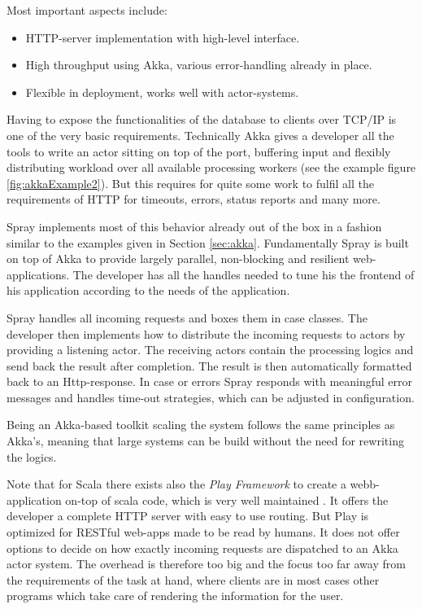 \documentclass[twoside, 11pt]{scrartcl}
\begin{document}
Most important aspects include:\\
\begin{itemize}
	\item HTTP-server implementation with high-level interface.
	\item High throughput using Akka, various error-handling already in place.
	\item Flexible in deployment, works well with actor-systems.
\end{itemize}

Having to expose the functionalities of the database to clients over TCP/IP is one of the very basic requirements.
Technically Akka gives a developer all the tools to write an actor sitting on top of the port, buffering input and flexibly distributing workload over all available processing workers (see the example figure \ref{fig:akkaExample2}). But this requires for quite some work to fulfil all the requirements of HTTP for timeouts, errors, status reports and many more.

Spray implements most of this behavior already out of the box in a fashion similar to the examples given in Section \ref{sec:akka}.
Fundamentally Spray is built on top of Akka to provide largely parallel, non-blocking and resilient web-applications. 
The developer has all the handles needed to tune his the frontend of his application according to the needs of the application.

Spray handles all incoming requests and boxes them in case classes. The developer then implements how to distribute the incoming requests to actors by providing a listening actor. The receiving actors contain the processing logics and send back the result after completion. The result is then automatically formatted back to an Http-response. In case or errors Spray responds with meaningful error messages and handles time-out strategies, which can be adjusted in configuration.

Being an Akka-based toolkit scaling the system follows the same principles as Akka's, meaning that large systems can be build without the need for rewriting the logics.

Note that for Scala there exists also the \textit{Play Framework} to create a webb-application on-top of scala code, which is very well maintained \cite{link:play}. 
It offers the developer a complete HTTP server with easy to use routing. But Play is optimized for RESTful web-apps made to be read by humans. It does not offer options to decide on how exactly incoming requests are dispatched to an Akka actor system. The overhead is therefore too big and the focus too far away from the requirements of the task at hand, where clients are in most cases other programs which take care of rendering the information for the user.
\end{document}
